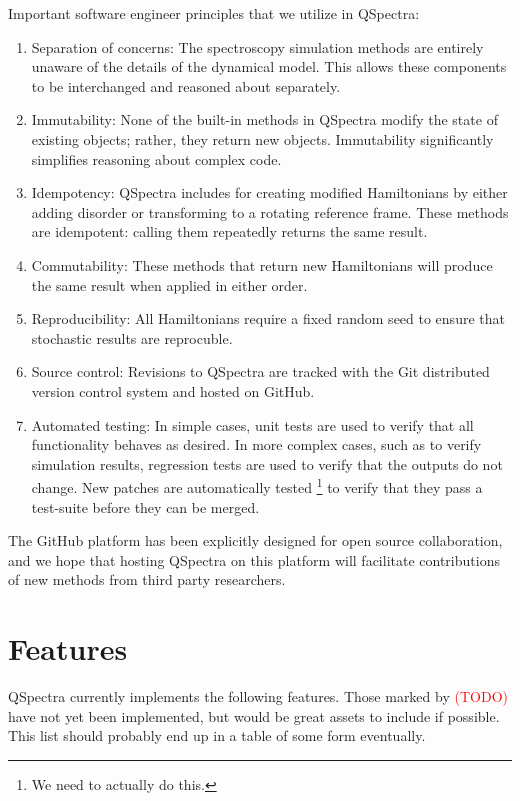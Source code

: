 \documentclass{article}
\begin{document}
Important software engineer principles that we utilize in QSpectra:

\begin{enumerate}
	\item Separation of concerns: The spectroscopy simulation methods are entirely unaware of the details of the dynamical model. This allows these components to be interchanged and reasoned about separately.
	\item Immutability: None of the built-in methods in QSpectra modify the state of existing objects; rather, they return new objects. Immutability significantly simplifies reasoning about complex code.
	\item Idempotency: QSpectra includes for creating modified Hamiltonians by either adding disorder or transforming to a rotating reference frame. These methods are idempotent: calling them repeatedly returns the same result.
	\item Commutability: These methods that return new Hamiltonians will produce the same result when applied in either order.
	\item Reproducibility: All Hamiltonians require a fixed random seed to ensure that stochastic results are reprocuble.
	\item Source control: Revisions to QSpectra are tracked with the Git distributed version control system and hosted on GitHub.
	\item Automated testing: In simple cases, unit tests are used to verify that all functionality behaves as desired. In more complex cases, such as to verify simulation results, regression tests are used to verify that the outputs do not change.
	New patches are automatically tested \footnote{We need to actually do this.} to verify that they pass a test-suite before they can be merged.
\end{enumerate}

The GitHub platform has been explicitly designed for open source collaboration, and we hope that hosting QSpectra on this platform will facilitate contributions of new methods from third party researchers.

\section{Features}

QSpectra currently implements the following features. Those marked by \textcolor{red}{(TODO)} have not yet been implemented, but would be great assets to include if possible. This list should probably end up in a table of some form eventually.
\end{document}
